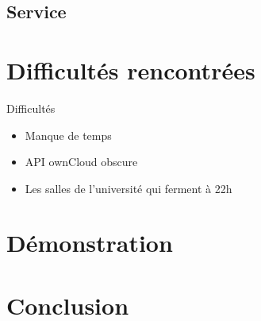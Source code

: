 \documentclass{beamer}
\begin{document}
	\subsection{Service}
		\begin{frame}{}
		\begin{itemize}

		\end{itemize}
		\end{frame}

		\begin{frame}{}
		\begin{itemize}

		\end{itemize}
		\end{frame}


	


\section{Difficultés rencontrées}
\begin{frame}{Difficultés}
		\begin{itemize}
		\item Manque de temps
		\item API ownCloud obscure
		\item Les salles de l'université qui ferment à 22h
		\end{itemize}
		\end{frame}


\section{Démonstration}

\section{Conclusion}
\end{document}
